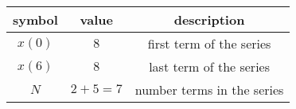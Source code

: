 
  \begin{tabular}{|c|c|c|}
    \hline
    \textbf{symbol} & \textbf{value} & \textbf{description} \\
    \hline
    $x(0)$ & $8$ & first term of the series \\
    \hline
    $x(6)$ & $8$ & last term of the series \\
    \hline
    $N$ & $2+5=7$ & number terms in the series \\
    \hline
  \end{tabular}
 
